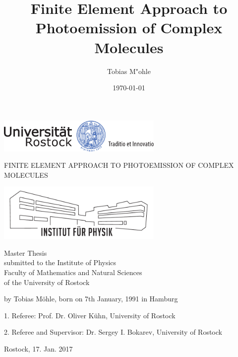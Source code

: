 \documentclass[12pt,a4paper,oneside]{book}
\author{Tobias M"ohle}
\date{\today }
\title{Finite Element Approach to Photoemission of Complex Molecules}
\begin{document}
\indent
\pagestyle{plain}
\parindent6mm
\setlength{\parskip}{0mm}
\renewcommand{\vec}{\bm}
\newcommand{\mat}[1]{\mathbb{#1}}
\newcommand{\prog}[1]{\texttt{#1}}
\newcommand{\eq}[1]{eq.(\ref{#1})}
\newcommand{\eqs}[1]{eqs.(\ref{#1})}
\begin{titlepage}
   \begin{center} 
   \vspace{30mm}
   \includegraphics[width=0.6\textwidth]{UNI-Logo_Siegel_4c_RZ}
   \vspace{20mm}

   \begin{center} 
   \Huge
   \uppercase{ Finite Element Approach to Photoemission of Complex Molecules}
   \end{center} 

   \vspace{25mm}
   
   \vfill

   \includegraphics[width=0.6\textwidth]{institutslogo_neu}
   \vspace{5mm}

   Master Thesis\\
   submitted to the Institute of Physics \\
   Faculty of Mathematics and Natural Sciences \\
   of the University of Rostock 
   
   \vspace{15mm}
   
   \end{center}

   by Tobias M\"ohle, born on 7th January, 1991 in Hamburg\\
   
   \vspace{15mm}
   
   1. Referee: Prof. Dr. Oliver K\"uhn, University of Rostock

   2. Referee and Supervisor: Dr. Sergey I. Bokarev, University of Rostock

   \vspace{7mm}
   Rostock, 17. Jan. 2017
   \vspace{7mm}
\end{titlepage}
\frontmatter

\newpage
\tableofcontents
\mainmatter
\end{document}
